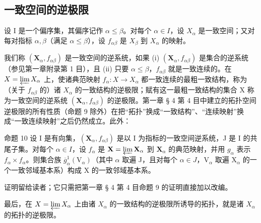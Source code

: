 \subsection{一致空间的逆极限}

设 I 是一个偏序集，其偏序记作 \(\alpha \leqslant \beta\)。对每个 \(\alpha \in I\)，设 \(X_{\alpha}\) 是一致空间；又对每对指标 \(\alpha, \beta\)（满足 \(\alpha \leqslant \beta\)），设 \(f_{\alpha \beta}\) 是 \(X_{\beta}\) 到 \(X_{\alpha}\) 的映射。

我们称 \((\mathbf{X}_{\alpha}, f_{\alpha\beta})\) 是一致空间的逆系统，如果 (i) \((\mathbf{X}_{\alpha}, f_{\alpha\beta})\) 是集合的逆系统（参见第一章附录第 1 目），且 (ii) 只要 \(\alpha \leqslant \beta\)，\(f_{\alpha\beta}\) 就是一致连续的。在 \(X = \varprojlim X_{\alpha}\) 上，使诸典范映射 \(f_{\alpha}: X \to X_{\alpha}\) 都一致连续的最粗一致结构，称为（关于 \(f_{\alpha\beta}\) 的）诸 \(X_{\alpha}\) 的一致结构的逆极限；赋有这一最粗一致结构的集合 X 称为一致空间的逆系统 \((\mathbf{X}_{\alpha}, f_{\alpha\beta})\) 的逆极限。第一章 § 4 第 4 目中建立的拓扑空间逆极限的所有性质（命题 9 除外）在把“拓扑”换成“一致结构”、“连续映射”换成“一致连续映射”之后仍然成立。此外：

命题 10 设 I 是有向集，\((\mathbf{X}_{\alpha}, f_{\alpha \beta})\) 是以 I 为指标的一致空间逆系统，J 是 I 的共尾子集。对每个 \(\alpha \in I\)，设 \(f_{\alpha}\) 是 \(\mathbf{X} = \varprojlim \mathbf{X}_{\alpha}\) 到 \(\mathbf{X}_{\alpha}\) 的典范映射，并用 \(g_{\alpha}\) 表示 \(f_{\alpha} \times f_{\alpha}\)。则集合族 \(\overline{g}_{\alpha}^{1}(\mathrm{V}_{\alpha})\)（其中 \(\alpha\) 取遍 J，且对每个 \(\alpha \in J\)，\(\mathrm{V}_{\alpha}\) 取遍 \(\mathrm{X}_{\alpha}\) 的一个一致邻域基本系）构成 X 的一致邻域基本系。

证明留给读者；它只需把第一章 § 4 第 4 目命题 9 的证明直接加以改编。

最后，在 \(X = \varprojlim X_{\alpha}\) 上由诸 \(X_{\alpha}\) 的一致结构的逆极限所诱导的拓扑，就是诸 \(X_{\alpha}\) 的拓扑的逆极限。

